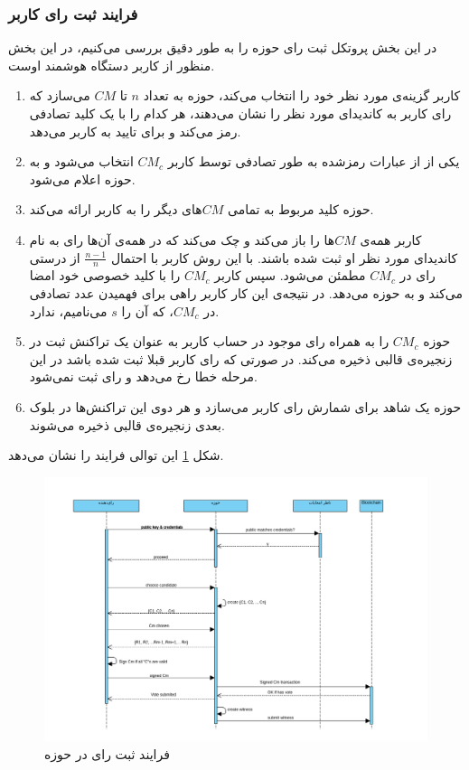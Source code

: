 \subsubsection{فرایند ثبت رای کاربر}
در این بخش پروتکل ثبت رای حوزه را به طور دقیق بررسی می‌کنیم، در این بخش منظور از کاربر دستگاه هوشمند اوست. 

\begin{enumerate}
	\item 
	کاربر گزینه‌ی مورد نظر خود را انتخاب می‌کند، حوزه به تعداد $n$ تا $CM$ می‌سازد که رای کاربر به کاندیدای مورد نظر را نشان می‌دهند، هر کدام را با یک کلید تصادفی رمز می‌کند و برای تایید به کاربر می‌دهد. 
	\item 
	یکی از از عبارات رمزشده به طور تصادفی توسط کاربر $CM_c$ انتخاب می‌شود و به حوزه اعلام می‌شود.
	\item 
	حوزه کلید مربوط به تمامی $CM$های دیگر را به کاربر ارائه می‌کند.
	\item 
	کاربر همه‌ی $CM$ها را باز می‌کند و چک می‌کند که در همه‌ی آن‌ها رای به نام کاندیدای مورد نظر او ثبت شده باشند. با این روش کاربر با احتمال $\frac{n-1}{n}$ از درستی رای در $CM_c$ مطمئن می‌شود. سپس کاربر $CM_c$ را با کلید خصوصی خود امضا می‌کند و به حوزه می‌دهد. در نتیجه‌ی این کار کاربر راهی برای فهمیدن عدد تصادفی در $CM_c$، که آن را $s$ می‌نامیم، ندارد.
	\item
	حوزه $CM_c$ را به همراه رای موجود در حساب کاربر به عنوان یک تراکنش ثبت در زنجیره‌ی قالبی ذخیره می‌کند. در صورتی که رای کاربر قبلا ثبت شده باشد در این مرحله خطا رخ می‌دهد و رای ثبت نمی‌شود. 
	\item
	حوزه یک شاهد برای شمارش رای کاربر می‌سازد و هر دوی این تراکنش‌ها در بلوک بعدی زنجیره‌ی قالبی ذخیره می‌شوند.
\end{enumerate}
شکل \ref{fig:seqdiag.png} این توالی فرایند را نشان می‌دهد.
\begin{figure}[h!]
	\centering
	\includegraphics[width=0.9\linewidth]{seqdiag.png}
	\caption {فرایند ثبت رای در حوزه}
	\label{fig:seqdiag.png}
\end{figure}

